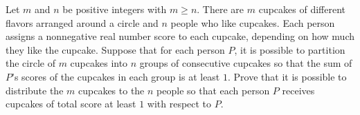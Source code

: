 Let $m$ and $n$ be positive integers with $m\geq n$. There are $m$ cupcakes of different flavors arranged around a circle and $n$ people who like cupcakes. Each person assigns a nonnegative real number score to each cupcake, depending on how much they like the cupcake. Suppose that for each person $P$, it is possible to partition the circle of $m$ cupcakes into $n$ groups of consecutive cupcakes so that the sum of $P$'s scores of the cupcakes in each group is at least $1$. Prove that it is possible to distribute the $m$ cupcakes to the $n$ people so that each person $P$ receives cupcakes of total score at least $1$ with respect to $P$.